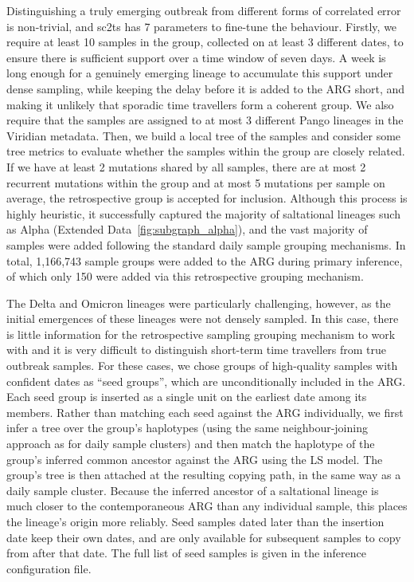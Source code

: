 \documentclass[12pt]{article}
\newcommand{\edref}[1]{Extended Data~\ref{#1}}
\begin{document}
Distinguishing a truly emerging outbreak from different forms of
correlated error is non-trivial, and
sc2ts has 7 parameters to fine-tune the behaviour.
Firstly, we require at least 10 samples in the
group, collected on at least 3 different dates,
to ensure there is sufficient support over a time window of
seven days.
A week is long enough for a genuinely emerging lineage to accumulate
this support under dense sampling, while keeping the delay before it is added
to the ARG short, and making it unlikely that sporadic time travellers
form a coherent group.
We also require that the samples are assigned to at most 3
different Pango lineages in the Viridian metadata.
Then, we build a local tree of the samples and consider
some tree metrics to evaluate whether the samples within the
group are closely related. If we have at least 2 mutations
shared by all samples, there are at most 2 recurrent mutations
within the group and at most 5 mutations per sample on average,
the retrospective group is accepted for inclusion.
Although this process is highly heuristic, it successfully
captured the majority of saltational lineages
such as Alpha (\edref{fig:subgraph_alpha}), and the
vast majority of samples were added following the standard
daily sample grouping mechanisms.
In total, 1,166,743 sample groups were added to the ARG
during primary inference, of which only 150 were
added via this retrospective grouping mechanism.

The Delta and Omicron lineages were
particularly challenging, however, as the initial emergences of
these lineages were not densely sampled. In this case,
there is little information for the retrospective sampling grouping mechanism
to work with and it is very difficult to distinguish short-term time travellers
from true outbreak samples. For these cases, we chose groups of
high-quality samples with confident dates as ``seed groups'', which are
unconditionally included in the ARG.
Each seed group is inserted as a single unit on the
earliest date among its members.
Rather than matching each seed against the ARG individually,
we first infer a tree over the group's haplotypes
(using the same neighbour-joining approach as for daily sample clusters)
and then match the haplotype of the group's inferred common ancestor
against the ARG using the LS model.
The group's tree is then attached at the resulting copying path,
in the same way as a daily sample cluster.
Because the inferred ancestor of a saltational lineage is much
closer to the contemporaneous ARG than any individual sample,
this places the lineage's origin more reliably.
Seed samples dated later than the insertion date keep their own dates,
and are only available for subsequent samples to copy from
after that date.
The full list of seed samples is given in the
inference configuration file.
\end{document}

